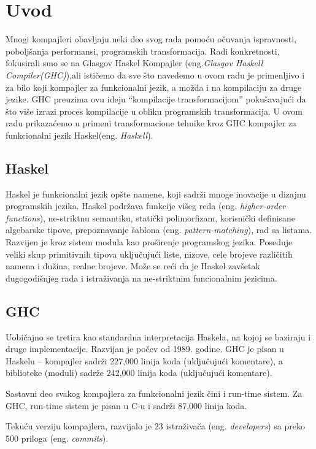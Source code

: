 \section{Uvod}
\label{sec:uvod}

Mnogi kompajleri obavljaju neki deo svog rada pomoću očuvanja ispravnosti, poboljšanja performansi, programskih transformacija. Radi konkretnosti, fokusirali smo se na Glasgov Haskel Kompajler (eng.\emph{Glasgov Haskell Compiler(GHC)}),ali ističemo da sve što navedemo u ovom radu je primenljivo i za bilo koji kompajler za funkcionalni jezik, a možda i
na kompilaciju za druge jezike. GHC preuzima ovu ideju “kompilacije transformacijom” pokušavajući da što više izrazi proces kompilacije u obliku programskih transformacija. U ovom radu prikazaćemo u primeni transformacione tehnike kroz GHC kompajler za funkcionalni jezik Haskel(eng. \emph{Haskell}).

\subsection{Haskel}
\label{subsec:podnaslovHaskel}
Haskel je funkcionalni jezik opšte namene, koji sadrži mnoge inovacije u dizajnu programskih jezika. Haskel podržava funkcije višeg reda (eng.\emph{ higher-order functions}), ne-striktnu semantiku, statički polimorfizam, korisnički definisane algebarske tipove, prepoznavanje šablona (eng. \emph{ pattern-matching}), rad sa listama. Razvijen je kroz sistem modula kao proširenje programskog jezika. Poseduje veliki skup primitivnih tipova uključujući liste, nizove, cele brojeve različitih namena i dužina, realne brojeve. Može se reći da je Haskel zavšetak dugogodišnjeg rada i istraživanja na ne-striktnim funcionalnim jezicima. 

\subsection{GHC}
\label{subsec:podnaslovGHC}

Uobičajno se tretira kao standardna interpretacija Haskela, na kojoj se baziraju i druge implementacije. Razvijan je počev od 1989. godine. GHC je pisan u Haskelu – kompajler sadrži 227,000 linija koda (uključujući komentare), a biblioteke (moduli) sadrže 242,000 linija koda (uključujući komentare).

Sastavni deo svakog kompajlera za funkcionalni jezik čini i run-time sistem. Za GHC, run-time sistem je pisan u C-u i sadrži 87,000 linija koda.

Tekuću verziju kompajlera, razvijalo je 23 istraživača (eng. \emph{developers}) sa preko 500 priloga (eng. \emph {commits}).

